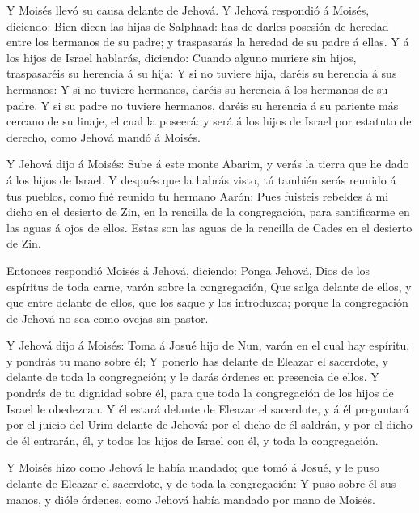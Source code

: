  Y Moisés llevó su causa delante de Jehová.  Y
Jehová respondió á Moisés, diciendo:  Bien dicen las hijas
de Salphaad: has de darles posesión de heredad entre los hermanos de su
padre; y traspasarás la heredad de su padre á ellas.  Y á
los hijos de Israel hablarás, diciendo: Cuando alguno muriere sin hijos,
traspasaréis su herencia á su hija:  Y si no tuviere hija,
daréis su herencia á sus hermanos:  Y si no tuviere
hermanos, daréis su herencia á los hermanos de su padre.  Y
si su padre no tuviere hermanos, daréis su herencia á su pariente más
cercano de su linaje, el cual la poseerá: y será á los hijos de Israel
por estatuto de derecho, como Jehová mandó á Moisés.

 Y Jehová dijo á Moisés: Sube á este monte Abarim, y verás
la tierra que he dado á los hijos de Israel.  Y después que
la habrás visto, tú también serás reunido á tus pueblos, como fué
reunido tu hermano Aarón:  Pues fuisteis rebeldes á mi
dicho en el desierto de Zin, en la rencilla de la congregación, para
santificarme en las aguas á ojos de ellos. Estas son las aguas de la
rencilla de Cades en el desierto de Zin.

 Entonces respondió Moisés á Jehová, diciendo:
 Ponga Jehová, Dios de los espíritus de toda carne, varón
sobre la congregación,  Que salga delante de ellos, y que
entre delante de ellos, que los saque y los introduzca; porque la
congregación de Jehová no sea como ovejas sin pastor.

 Y Jehová dijo á Moisés: Toma á Josué hijo de Nun, varón en
el cual hay espíritu, y pondrás tu mano sobre él;  Y
ponerlo has delante de Eleazar el sacerdote, y delante de toda la
congregación; y le darás órdenes en presencia de ellos.  Y
pondrás de tu dignidad sobre él, para que toda la congregación de los
hijos de Israel le obedezcan.  Y él estará delante de
Eleazar el sacerdote, y á él preguntará por el juicio del Urim delante
de Jehová: por el dicho de él saldrán, y por el dicho de él entrarán,
él, y todos los hijos de Israel con él, y toda la congregación.

 Y Moisés hizo como Jehová le había mandado; que tomó á
Josué, y le puso delante de Eleazar el sacerdote, y de toda la
congregación:  Y puso sobre él sus manos, y dióle órdenes,
como Jehová había mandado por mano de Moisés.

